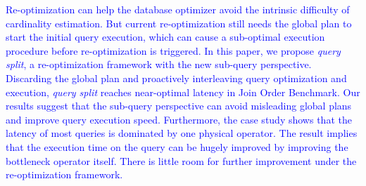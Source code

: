 \textcolor{blue}{
    Re-optimization can help the database optimizer avoid the intrinsic difficulty of cardinality estimation. But current re-optimization still needs the global plan to start the initial query execution, which can cause a sub-optimal execution procedure before re-optimization is triggered. In this paper, we propose \textit{query split}, a re-optimization framework with the new sub-query perspective. Discarding the global plan and proactively interleaving query optimization and execution, \textit{query split} reaches near-optimal latency in Join Order Benchmark. Our results suggest that the sub-query perspective can avoid misleading global plans and improve query execution speed. Furthermore, the case study shows that the latency of most queries is dominated by one physical operator. The result implies that the execution time on the query can be hugely improved by improving the bottleneck operator itself. There is little room for further improvement under the re-optimization framework.
}
